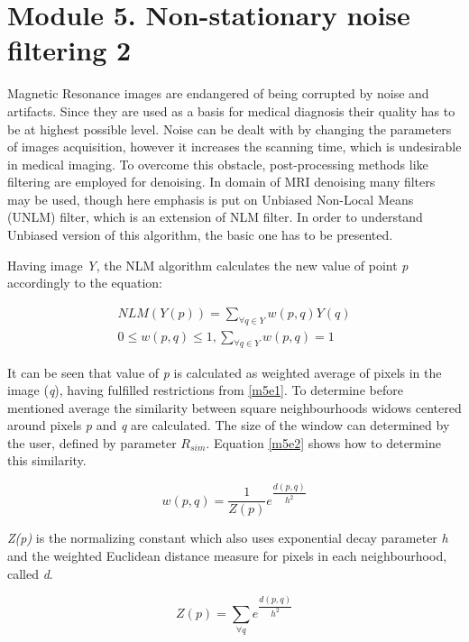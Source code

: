 \section{Module 5. Non-stationary noise filtering 2}

Magnetic Resonance images are endangered of being corrupted by noise
and artifacts. Since they are used as a basis for medical diagnosis
their quality has to be at highest possible level. Noise can be dealt
with by changing the parameters of images acquisition, however it
increases the scanning time, which is undesirable in medical imaging.
To overcome this obstacle, post-processing methods like filtering
are employed for denoising. In domain of MRI denoising many filters
may be used, though here emphasis is put on Unbiased Non-Local Means
(UNLM) filter, which is an extension of NLM filter. In order to understand
Unbiased version of this algorithm, the basic one has to be presented.

Having image \textit{Y}, the NLM algorithm calculates the new value
of point \textit{p} accordingly to the equation:

\begin{equation}
\begin{aligned}NLM(Y(p))=\sum_{\forall q\in Y}^ {}w(p,q)Y(q)\\
0\le w(p,q)\le1,\sum_{\forall q\in Y}^ {}w(p,q)=1
\end{aligned}
\label{m5e1}
\end{equation}

It can be seen that value of \textit{p} is calculated as weighted
average of pixels in the image (\textit{q}), having fulfilled restrictions
from \ref{m5e1}. To determine before mentioned average the similarity
between square neighbourhoods widows centered around pixels \textit{p}
and \textit{q} are calculated. The size of the window can determined
by the user, defined by parameter $R_{sim}$. Equation \ref{m5e2}
shows how to determine this similarity.

\begin{equation}
w(p,q)=\frac{1}{Z(p)}e^{\dfrac{d(p,q)}{h^{2}}}\label{m5e2}
\end{equation}

\textit{Z(p)} is the normalizing constant which also uses exponential
decay parameter \textit{h} and the weighted Euclidean distance measure
for pixels in each neighbourhood, called \textit{d}.

\begin{equation}
Z(p)=\sum_{\forall q}^ {}e^{\dfrac{d(p,q)}{h^{2}}}\label{m5e5}
\end{equation}

